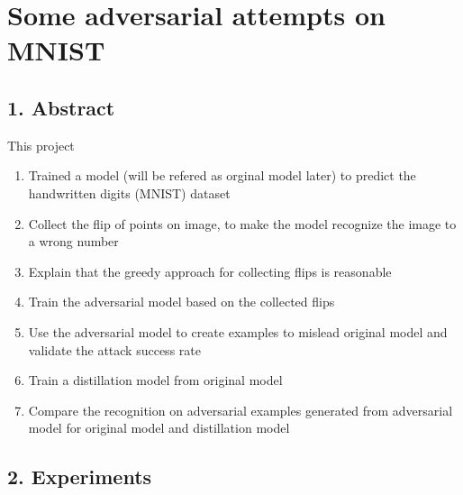 \documentclass[
]{article}
\author{}
\date{}
\providecommand{\tightlist}{%
  \setlength{\itemsep}{0pt}\setlength{\parskip}{0pt}}
\begin{document}
\hypertarget{some-adversarial-attempts-on-mnist}{%
\section{Some adversarial attempts on
MNIST}\label{some-adversarial-attempts-on-mnist}}

\hypertarget{abstract}{%
\subsection{1. Abstract}\label{abstract}}

This project

\begin{enumerate}
\def\labelenumi{\arabic{enumi}.}
\tightlist
\item
  Trained a model (will be refered as orginal model later) to predict
  the handwritten digits (MNIST) dataset
\item
  Collect the flip of points on image, to make the model recognize the
  image to a wrong number
\item
  Explain that the greedy approach for collecting flips is reasonable
\item
  Train the adversarial model based on the collected flips
\item
  Use the adversarial model to create examples to mislead original model
  and validate the attack success rate
\item
  Train a distillation model from original model
\item
  Compare the recognition on adversarial examples generated from
  adversarial model for original model and distillation model
\end{enumerate}

\hypertarget{Experiments}{%
\subsection{2. Experiments}\label{design-of-experiment}}
\end{document}
